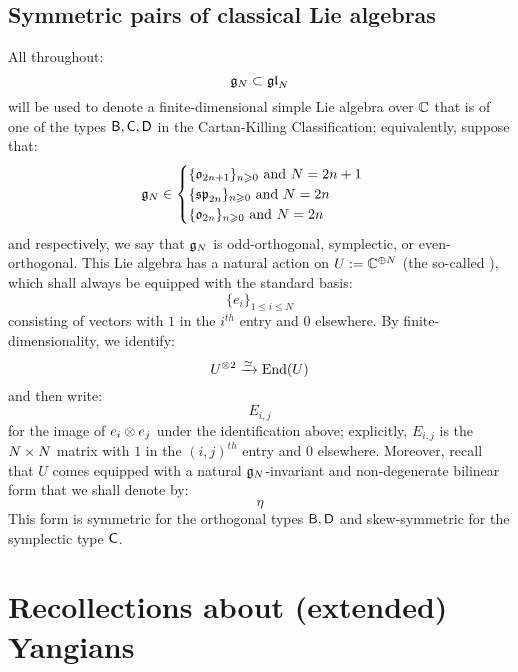         \subsection{Symmetric pairs of classical Lie algebras}
            All throughout:
                $$\mathfrak{g}_N \subset \mathfrak{gl}_N$$
            will be used to denote a finite-dimensional simple Lie algebra over $\mathbb{C}$ that is of one of the types $\mathsf{B}, \mathsf{C}, \mathsf{D}$ in the Cartan-Killing Classification; equivalently, suppose that:
                $$
                    \mathfrak{g}_N \in
                    \begin{cases}
                        \text{$\{ \mathfrak{o}_{2n + 1} \}_{n \geqslant 0}$ and $N = 2n + 1$}
                        \\
                        \text{$\{ \mathfrak{sp}_{2n} \}_{n \geqslant 0}$ and $N = 2n$}
                        \\
                        \text{$\{ \mathfrak{o}_{2n} \}_{n \geqslant 0}$ and $N = 2n$}
                    \end{cases}
                $$
            and respectively, we say that $\mathfrak{g}_N$ is odd-orthogonal, symplectic, or even-orthogonal. This Lie algebra has a natural action on $U := \mathbb{C}^{\oplus N}$ (the so-called ), which shall always be equipped with the standard basis:
                $$\{e_i\}_{1 \leq i \leq N}$$
            consisting of vectors with $1$ in the $i^{th}$ entry and $0$ elsewhere. By finite-dimensionality, we identify:
                $$U^{\tensor 2} \xrightarrow[]{\cong} \End(U)$$
            and then write:
                $$E_{i, j}$$
            for the image of $e_i \tensor e_j$ under the identification above; explicitly, $E_{i, j}$ is the $N \x N$ matrix with $1$ in the $(i, j)^{th}$ entry and $0$ elsewhere. Moreover, recall that $U$ comes equipped with a natural $\mathfrak{g}_N$-invariant and non-degenerate bilinear form that we shall denote by:
                $$\eta$$
            This form is symmetric for the orthogonal types $\mathsf{B}, \mathsf{D}$ and skew-symmetric for the symplectic type $\mathsf{C}$.

    \section{Recollections about (extended) Yangians}
